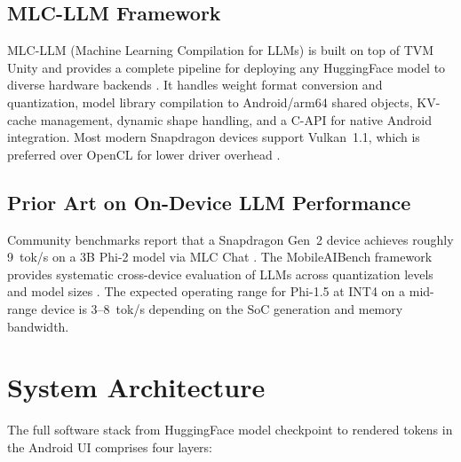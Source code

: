 \documentclass[12pt,letterpaper]{article}
\begin{document}
\subsection{MLC-LLM Framework}

MLC-LLM (Machine Learning Compilation for LLMs) is built on top of TVM Unity and
provides a complete pipeline for deploying any HuggingFace model to diverse
hardware backends \cite{mlcllm}.
It handles weight format conversion and quantization, model library compilation
to Android/arm64 shared objects, KV-cache management, dynamic shape handling,
and a C-API for native Android integration.
Most modern Snapdragon devices support Vulkan~1.1, which is preferred over
OpenCL for lower driver overhead \cite{mlcandroid}.

\subsection{Prior Art on On-Device LLM Performance}

Community benchmarks report that a Snapdragon Gen~2 device achieves roughly
9~tok/s on a 3B Phi-2 model via MLC Chat \cite{reddit_benchmark}.
The MobileAIBench framework provides systematic cross-device evaluation of
LLMs across quantization levels and model sizes \cite{mobileaibench}.
The expected operating range for Phi-1.5 at INT4 on a mid-range device is
3--8~tok/s depending on the SoC generation and memory bandwidth.

\section{System Architecture}

The full software stack from HuggingFace model checkpoint to rendered tokens
in the Android UI comprises four layers:
\end{document}
